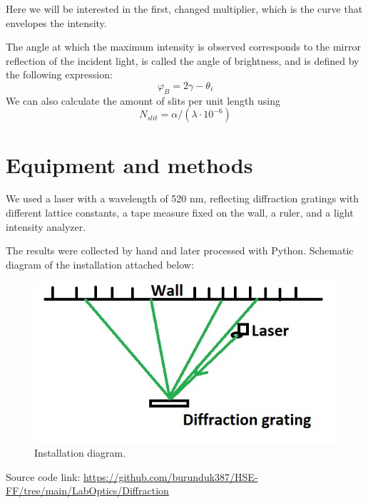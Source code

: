 \documentclass[a4paper, 12pt]{article}
\renewcommand{\phi}{\varphi} %
\begin{document}
	Here we will be interested in the first, changed multiplier, which is the curve that envelopes the intensity.
	
	The angle at which the maximum intensity is observed corresponds to the mirror reflection of the incident light, is called the angle of brightness, and is defined by the following expression:
	\begin{equation}
		\phi_B = 2\gamma - \theta_i
	\end{equation}
	We can also calculate the amount of slits per unit length using
	\begin{equation}
		N_{slit} = \alpha / (\lambda \cdot 10^{-6})
	\end{equation}
	\section*{Equipment and methods}
	We used a laser with a wavelength of 520 nm, reflecting diffraction gratings with different lattice constants, a tape measure fixed on the wall, a ruler, and a light intensity analyzer.
	
	The results were collected by hand and later processed with Python. Schematic diagram of the installation attached below:
	\begin{figure}[H]
		\centering
		\includegraphics[width=0.85\linewidth]{sch1.jpg}
		\caption{Installation diagram.}
		\label{fig:3}
	\end{figure}
	
	Source code link:
	\newline
	\href{https://github.com/burunduk387/HSE-FF/tree/main/LabOptics/Diffraction}{https://github.com/burunduk387/HSE-FF/tree/main/LabOptics/Diffraction}
\end{document}
